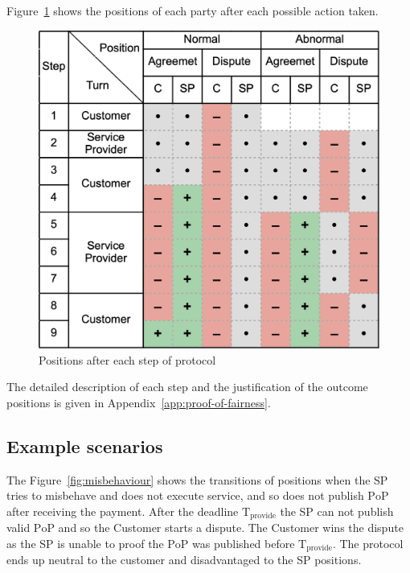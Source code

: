 \documentclass[pdftex,twocolumn,epjc3]{svjour3}
\begin{document}
{Figure~\ref{fig:positions} shows the positions of each party after each possible action taken.

\begin{figure}[h!]
\includegraphics[width=\linewidth]{model.png}
\centering
\caption{Positions after each step of protocol}
\label{fig:positions}
\end{figure}

The detailed description of each step and the justification
of the outcome positions is given in Appendix~\ref{app:proof-of-fairness}.

\subsection{Example scenarios}\label{example-scenarios}

The Figure~\ref{fig:misbehaviour} shows the transitions of positions when the SP tries to misbehave and does not execute service, and so does not publish $\mathrm{PoP}$ after receiving the payment. After the deadline $\mathrm{T}_\mathrm{provide}$ the SP can not publish valid $\mathrm{PoP}$ and so the Customer starts a dispute. The Customer wins the dispute as the SP is unable to proof the $\mathrm{PoP}$ was published before $\mathrm{T}_\mathrm{provide}$. The protocol ends up neutral to the customer and disadvantaged to the SP positions.

}
\end{document}
